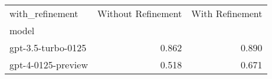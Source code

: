\begin{tabular}{lrr}
\toprule
with_refinement & Without Refinement & With Refinement \\
model &  &  \\
\midrule
gpt-3.5-turbo-0125 & 0.862 & 0.890 \\
gpt-4-0125-preview & 0.518 & 0.671 \\
\bottomrule
\end{tabular}
